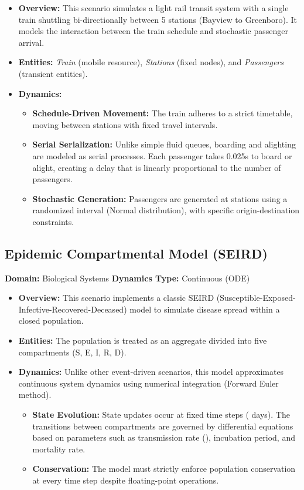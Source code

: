 \begin{itemize}[leftmargin=*]
\item \textbf{Overview:} This scenario simulates a light rail transit system with a single train shuttling bi-directionally between 5 stations (Bayview to Greenboro). It models the interaction between the train schedule and stochastic passenger arrival.
\item \textbf{Entities:} \textit{Train} (mobile resource), \textit{Stations} (fixed nodes), and \textit{Passengers} (transient entities).
\item \textbf{Dynamics:}
\begin{itemize}
\item \textbf{Schedule-Driven Movement:} The train adheres to a strict timetable, moving between stations with fixed travel intervals.
\item \textbf{Serial Serialization:} Unlike simple fluid queues, boarding and alighting are modeled as serial processes. Each passenger takes 0.025s to board or alight, creating a delay that is linearly proportional to the number of passengers.
\item \textbf{Stochastic Generation:} Passengers are generated at stations using a randomized interval (Normal distribution), with specific origin-destination constraints.
\end{itemize}
\end{itemize}

\subsection{Epidemic Compartmental Model (SEIRD)}
\textbf{Domain:} Biological Systems 
\textbf{Dynamics Type:} Continuous (ODE)

\begin{itemize}[leftmargin=*]
\item \textbf{Overview:} This scenario implements a classic SEIRD (Susceptible-Exposed-Infective-Recovered-Deceased) model to simulate disease spread within a closed population.
\item \textbf{Entities:} The population is treated as an aggregate divided into five compartments (S, E, I, R, D).
\item \textbf{Dynamics:} Unlike other event-driven scenarios, this model approximates continuous system dynamics using numerical integration (Forward Euler method).
\begin{itemize}
\item \textbf{State Evolution:} State updates occur at fixed time steps ( days). The transitions between compartments are governed by differential equations based on parameters such as transmission rate (), incubation period, and mortality rate.
\item \textbf{Conservation:} The model must strictly enforce population conservation at every time step despite floating-point operations.
\end{itemize}
\end{itemize}

